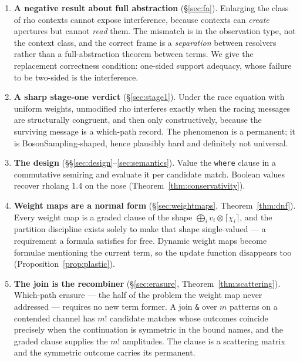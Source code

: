 \documentclass[11pt,a4paper]{article}
\theoremstyle{plain}
\theoremstyle{definition}
\theoremstyle{remark}
\newcommand{\tensorv}{\otimes}
\newcommand{\crisp}[1]{\lceil #1 \rceil}
\begin{document}
\begin{enumerate}[leftmargin=1.4em,itemsep=3pt]
\item \textbf{A negative result about full abstraction} (\S\ref{sec:fa}).
Enlarging the class of rho contexts cannot expose interference, because contexts
can \emph{create} apertures but cannot \emph{read} them. The mismatch is in the
observation type, not the context class, and the correct frame is a
\emph{separation} between resolvers rather than a full-abstraction theorem
between terms. We give the replacement correctness condition: one-sided support
adequacy, whose failure to be two-sided is the interference.

\item \textbf{A sharp stage-one verdict} (\S\ref{sec:stage1}). Under the
race equation with uniform weights, unmodified rho interferes exactly when the
racing messages are structurally congruent, and then only constructively, because
the surviving message is a which-path record. The phenomenon is a permanent; it
is BosonSampling-shaped, hence plausibly hard and definitely not universal.

\item \textbf{The design} (\S\S\ref{sec:design}--\ref{sec:semantics}). Value the
\texttt{where} clause in a commutative semiring and evaluate it per candidate
match. Boolean values recover rholang 1.4 on the nose
(Theorem~\ref{thm:conservativity}).

\item \textbf{Weight maps are a normal form} (\S\ref{sec:weightmaps},
Theorem~\ref{thm:dnf}). Every weight map is a graded clause of the shape
$\bigoplus_i v_i \tensorv \crisp{\chi_i}$, and the partition discipline exists
solely to make that shape single-valued --- a requirement a formula satisfies for
free. Dynamic weight maps become formulae mentioning the current term, so the
update function disappears too (Proposition~\ref{prop:plastic}).

\item \textbf{The join is the recombiner} (\S\ref{sec:erasure},
Theorem~\ref{thm:scattering}). Which-path erasure --- the half of the problem the
weight map never addressed --- requires no new term former. A join
\texttt{\&} over $m$ patterns on a contended channel has $m!$ candidate matches
whose outcomes coincide precisely when the continuation is symmetric in the bound
names, and the graded clause supplies the $m!$ amplitudes. The clause is a
scattering matrix and the symmetric outcome carries its permanent.


\end{enumerate}
\end{document}
